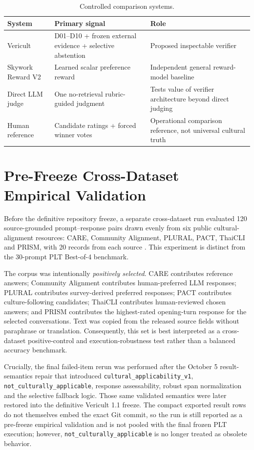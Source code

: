 \begin{table}[htbp]
\centering
\caption{Controlled comparison systems.}
\label{tab:comparison-systems}
\begin{tabularx}{\textwidth}{p{3.2cm}p{4.3cm}X}
\toprule
\textbf{System} & \textbf{Primary signal} & \textbf{Role} \\
\midrule
Vericult & D01--D10 + frozen external evidence + selective abstention & Proposed inspectable verifier \\
Skywork Reward V2 & Learned scalar preference reward & Independent general reward-model baseline \\
Direct LLM judge & One no-retrieval rubric-guided judgment & Tests value of verifier architecture beyond direct judging \\
Human reference & Candidate ratings + forced winner votes & Operational comparison reference, not universal cultural truth \\
\bottomrule
\end{tabularx}
\end{table}

\section{Pre-Freeze Cross-Dataset Empirical Validation}
\label{sec:external120-pre-freeze}

Before the definitive repository freeze, a separate cross-dataset run evaluated 120 source-grounded prompt--response pairs drawn evenly from six public cultural-alignment resources: CARE, Community Alignment, PLURAL, PACT, ThaiCLI and PRISM, with 20 records from each source \parencite{guo2025care,zhang2026cultivating,agarwal2026plural,borah2026pact,kim2025thaicli,kirk2024prism}. This experiment is distinct from the 30-prompt PLT Best-of-4 benchmark.

The corpus was intentionally \emph{positively selected}. CARE contributes reference answers; Community Alignment contributes human-preferred LLM responses; PLURAL contributes survey-derived preferred responses; PACT contributes culture-following candidates; ThaiCLI contributes human-reviewed chosen answers; and PRISM contributes the highest-rated opening-turn response for the selected conversations. Text was copied from the released source fields without paraphrase or translation. Consequently, this set is best interpreted as a cross-dataset positive-control and execution-robustness test rather than a balanced accuracy benchmark.

Crucially, the final failed-item rerun was performed after the October 5 result-semantics repair that introduced \texttt{cultural\_applicability\_v1}, \texttt{not\_culturally\_applicable}, response assessability, robust span normalization and the selective fallback logic. Those same validated semantics were later restored into the definitive Vericult 1.1 freeze. The compact exported result rows do not themselves embed the exact Git commit, so the run is still reported as a pre-freeze empirical validation and is not pooled with the final frozen PLT execution; however, \texttt{not\_culturally\_applicable} is no longer treated as obsolete behavior.

